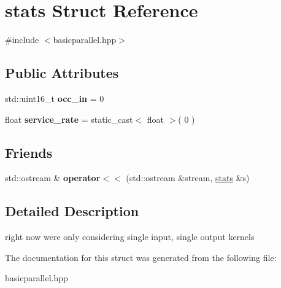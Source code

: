 \hypertarget{structstats}{}\section{stats Struct Reference}
\label{structstats}


{\ttfamily \#include $<$basicparallel.\+hpp$>$}

\subsection*{Public Attributes}
\begin{DoxyCompactItemize}
\item 
\hypertarget{structstats_a85ea5e0c637b929216e86a55c1b83264}{}std\+::uint16\+\_\+t {\bfseries occ\+\_\+in} = 0\label{structstats_a85ea5e0c637b929216e86a55c1b83264}

\item 
\hypertarget{structstats_ad223443981e12cb0aefd5b5bfe4a0e20}{}float {\bfseries service\+\_\+rate} = static\+\_\+cast$<$ float $>$( 0 )\label{structstats_ad223443981e12cb0aefd5b5bfe4a0e20}

\end{DoxyCompactItemize}
\subsection*{Friends}
\begin{DoxyCompactItemize}
\item 
\hypertarget{structstats_a964dc7f83480d5396550ec5586f1b72a}{}std\+::ostream \& {\bfseries operator$<$$<$} (std\+::ostream \&stream, \hyperlink{structstats}{stats} \&s)\label{structstats_a964dc7f83480d5396550ec5586f1b72a}

\end{DoxyCompactItemize}


\subsection{Detailed Description}
right now we\textquotesingle{}re only considering single input, single output kernels 

The documentation for this struct was generated from the following file\+:\begin{DoxyCompactItemize}
\item 
basicparallel.\+hpp\end{DoxyCompactItemize}
